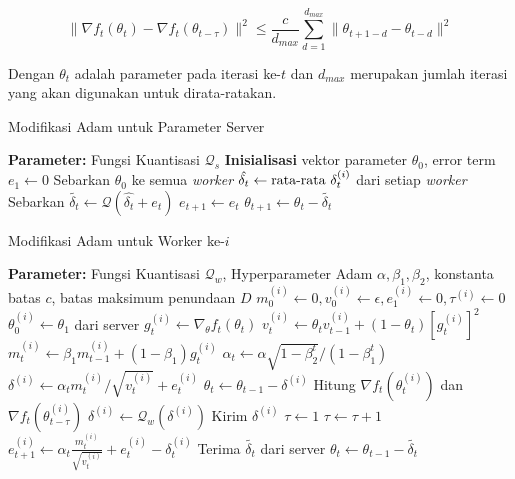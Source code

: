 \begin{equation}
  \label{cada2cond}
  \|\nabla f_t(\theta_t) - \nabla f_t(\theta_{t-\tau})\|^2 \leq \frac{c}{d_{max}} \sum_{d=1}^{d_{max}} \|\theta_{t+1-d} - \theta_{t-d}\|^2
\end{equation}

Dengan $\theta_t$ adalah parameter pada iterasi ke-$t$ dan $d_{max}$ merupakan jumlah iterasi yang akan digunakan untuk dirata-ratakan.

\begin{algorithm}[H]
  \caption{Modifikasi Adam untuk Parameter Server}\label{myadam_server}
  \begin{algorithmic}[1]
    \State \textbf{Parameter:} Fungsi Kuantisasi $\mathcal{Q}_s$
    \State \textbf{Inisialisasi} vektor parameter $\theta_0$, error term $e_1 \gets 0$
    \State Sebarkan $\theta_0$ ke semua \textit{worker}
    \State $\hat{\delta_t} \gets \textnormal{rata-rata } \delta_t^{(i)}$ dari setiap \textit{worker}
    \State Sebarkan $\tilde{\delta_t} \gets \mathcal{Q}(\hat{\delta_t} + e_t)$
    \State $e_{t+1} \gets e_{t}$
    \State $\theta_{t+1} \gets \theta_t - \tilde{\delta_t}$
    \EndFor
  \end{algorithmic}
\end{algorithm}

\begin{algorithm}[H]
  \caption{Modifikasi Adam untuk Worker ke-$i$}\label{myadam_worker}
  \begin{algorithmic}[1]
    \State \textbf{Parameter:} Fungsi Kuantisasi $\mathcal{Q}_w$, Hyperparameter Adam $\alpha, \beta_1, \beta_2$, konstanta batas $c$, batas maksimum penundaan $D$
    \State $m_0^{(i)} \gets 0, v_0^{(i)} \gets \epsilon, e_1^{(i)} \gets 0, \tau^{(i)} \gets 0$
    \State $\theta^{(i)}_0 \gets \theta_1$ dari server
    \State $g_t^{(i)} \gets \nabla_\theta f_t(\theta_{t})$
    \State $v_t^{(i)} \gets \theta_t v_{t-1}^{(i)} + (1-\theta_t)[g_t^{(i)}]^2$
    \State $m_t^{(i)} \gets \beta_1 m_{t-1}^{(i)} + (1-\beta_1)g_t^{(i)}$
    \State $\alpha_t \gets \alpha \sqrt{1-\beta_2^t}/(1-\beta_1^t)$
    \State $\delta^{(i)} \gets \alpha_t m_t^{(i)}/\sqrt{v_t^{(i)}}+e_t^{(i)}$
    \State $\theta_t \gets \theta_{t-1} - \delta^{(i)}$
    \State Hitung $\nabla f_t(\theta^{(i)}_{t})$ dan $\nabla f_t(\theta^{(i)}_{t-\tau})$
    \State $\delta^{(i)} \gets \mathcal{Q}_w(\delta^{(i)})$
    \State Kirim $\delta^{(i)}$
    \State $\tau \gets 1$
    \Else
    \State $\tau \gets \tau + 1$
    \EndIf
    \State $e_{t+1}^{(i)} \gets \alpha_t \frac{m_t^{(i)}}{\sqrt{v_t^{(i)}}} + e_t^{(i)} - \delta_t^{(i)}$
    \State Terima $\tilde{\delta_t}$ dari server
    \State $\theta_{t} \gets \theta_{t-1} - \tilde{\delta_t}$
    \EndFor
  \end{algorithmic}
\end{algorithm}

